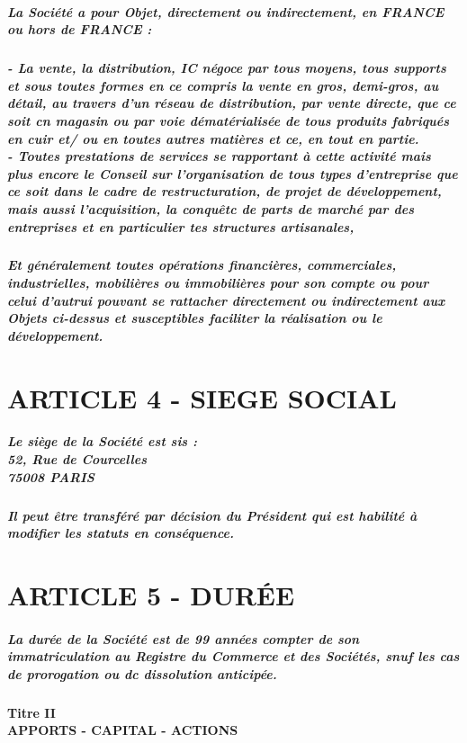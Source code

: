 \documentclass[a4paper, 11pt]{article}
\begin{document}
\subparagraph{
  La Société a pour Objet, directement ou indirectement, en FRANCE ou hors de FRANCE :
}

\subparagraph{
  - La vente, la distribution, IC négoce par tous moyens, tous supports et sous toutes formes en ce compris la vente en gros, demi-gros, au détail, au travers d'un réseau de distribution, par vente directe, que ce soit cn magasin ou par voie dématérialisée de tous produits fabriqués en cuir et/ ou en toutes autres matières et ce, en tout en partie.\\
  - Toutes prestations de services se rapportant à cette activité mais plus encore le Conseil sur l'organisation de tous types d'entreprise que ce soit dans le cadre de restructuration, de projet de développement, mais aussi l'acquisition, la conquêtc de parts de marché par des entreprises et en particulier tes structures artisanales,
}

\subparagraph{
  Et généralement toutes opérations financières, commerciales, industrielles, mobilières ou immobilières pour son compte ou pour celui d'autrui pouvant se rattacher directement ou indirectement aux Objets ci-dessus et susceptibles faciliter la réalisation ou le développement.
}
\section*{ARTICLE 4 - SIEGE SOCIAL}

\subparagraph{
  Le siège de la Société est sis :\\
  52, Rue de Courcelles\\
  75008 PARIS
}

\subparagraph{
  Il peut être transféré par décision du Président qui est habilité à modifier les statuts en conséquence.
}

\section*{ARTICLE 5 - DURÉE}

\subparagraph{
  La durée de la Société est de 99 années compter de son immatriculation au Registre du Commerce et des Sociétés, snuf les cas de prorogation ou dc dissolution anticipée.
}

\paragraph{
  Titre II\\
  APPORTS - CAPITAL - ACTIONS
}
\end{document}
